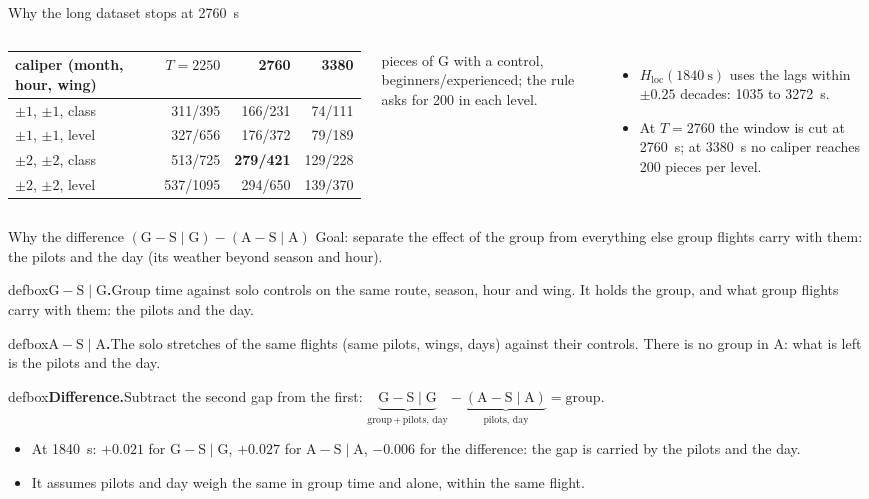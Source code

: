 \documentclass[11pt,aspectratio=169]{beamer}
\newcommand{\Sl}{\mathrm{S}}
\newcommand{\G}{\mathrm{G}}
\newcommand{\A}{\mathrm{A}}
\newcommand{\SG}{\Sl\!\mid\!\G}
\newcommand{\SAA}{\Sl\!\mid\!\A}
\newcommand{\Hloc}{H_{\mathrm{loc}}}
\newcommand{\defn}[2]{%
  \begin{beamercolorbox}[wd=\linewidth,sep=5pt]{defbox}\small\textcolor{steel}{\textbf{#1.}}\enspace #2\end{beamercolorbox}}
\begin{document}
\begin{frame}[label=app-longT]{Why the long dataset stops at 2760~s}
\begin{columns}[T,onlytextwidth]
\footnotesize\setlength{\tabcolsep}{3pt}
\begin{tabular}{@{}l r r r@{}}
\toprule
caliper (month, hour, wing) & $T=2250$ & 2760 & 3380 \\
\midrule
$\pm1$, $\pm1$, class & 311/395 & 166/231 & 74/111 \\
$\pm1$, $\pm1$, level & 327/656 & 176/372 & 79/189 \\
$\pm2$, $\pm2$, class & 513/725 & \textbf{279/421} & 129/228 \\
$\pm2$, $\pm2$, level & 537/1095 & 294/650 & 139/370 \\
\bottomrule
\end{tabular}

{\scriptsize pieces of $\G$ with a control, beginners/experienced; the rule asks for 200 in each level.}
\begin{itemize}
  \item $\Hloc(1840~\mathrm{s})$ uses the lags within $\pm0.25$ decades: 1035 to 3272~s.
  \item At $T=2760$ the window is cut at 2760~s; at 3380~s no caliper reaches 200 pieces per level.
\end{itemize}
\end{columns}
\end{frame}

\begin{frame}[label=app-selection]{Why the difference $(\G-\SG)-(\A-\SAA)$}
\noindent Goal: separate the effect of the group from everything else group flights carry with them: the pilots and the day (its weather beyond season and hour).
\vspace{1mm}
\defn{$\G-\SG$}{Group time against solo controls on the same route, season, hour and wing. It holds the group, and what group flights carry with them: the pilots and the day.}
\vspace{1mm}
\defn{$\A-\SAA$}{The solo stretches of the same flights (same pilots, wings, days) against their controls. There is no group in $\A$: what is left is the pilots and the day.}
\vspace{1mm}
\defn{Difference}{Subtract the second gap from the first: $\underbrace{\G-\SG}_{\text{group}\,+\,\text{pilots, day}}-\underbrace{(\A-\SAA)}_{\text{pilots, day}}=\text{group}$.}
\begin{itemize}
  \item At 1840~s: $+0.021$ for $\G-\SG$, $+0.027$ for $\A-\SAA$, $-0.006$ for the difference: the gap is carried by the pilots and the day.
  \item It assumes pilots and day weigh the same in group time and alone, within the same flight.
\end{itemize}
\end{frame}
\end{document}
